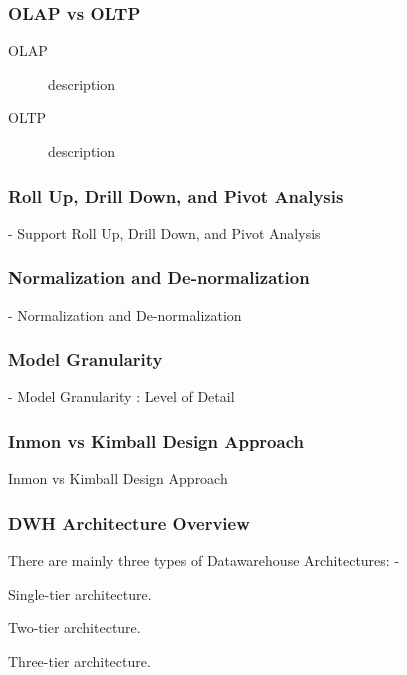 
\begin{frame}
\frametitle{OLAP vs OLTP}

\begin{description}
	\item[OLAP] description
	\item[OLTP] description
\end{description}

\end{frame}

\begin{frame}
    \frametitle{Roll Up, Drill Down, and Pivot Analysis}

    - Support Roll Up, Drill Down, and Pivot Analysis\\

\end{frame}


\begin{frame}
    \frametitle{Normalization and De-normalization}

    - Normalization and De-normalization\\
\end{frame}


\begin{frame}
    \frametitle{Model Granularity}

    - Model Granularity : Level of Detail\\
\end{frame}



\begin{frame}
    \frametitle{Inmon vs Kimball Design Approach }

    Inmon vs Kimball Design Approach

\end{frame}


%
\begin{frame}
    \frametitle{DWH Architecture Overview}
    There are mainly three types of Datawarehouse Architectures: -
    \begin{wideitemize}
        \item Single-tier architecture.
        \item Two-tier architecture.
        \item Three-tier architecture.
    \end{wideitemize}

\end{frame}


